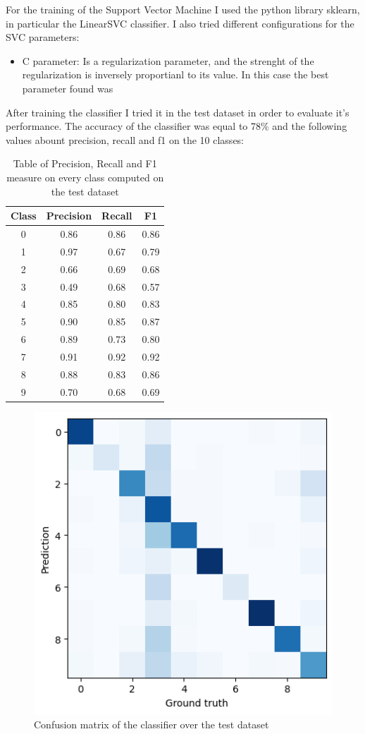\documentclass[12pt,journal,compsoc]{IEEEtran}
\begin{document}
For the training of the Support Vector Machine I used the python library sklearn, in particular the LinearSVC classifier. I also tried different configurations for the SVC parameters:
\begin{itemize}
	\item C parameter: Is a regularization parameter, and the strenght of the regularization is inversely proportianl to its value. In this case the best parameter found was 
\end{itemize}
After training the classifier I tried it in the test dataset in order to evaluate it's performance. The accuracy of the classifier was equal to 78\% and the following values abount precision, recall and f1 on the 10 classes:
\begin{table}[ht]
	\centering
	\begin{tabular}{c c c c }
		Class & Precision & Recall & F1  \\
		\hline
		0 & 0.86 &0.86  &0.86        \\
		1 & 0.97 &0.67  &0.79        \\
		2 & 0.66 &0.69  &0.68        \\
		3 & 0.49 &0.68  &0.57        \\ 
		4 & 0.85 &0.80  &0.83        \\
		5 & 0.90 &0.85  &0.87        \\
		6 & 0.89 &0.73  &0.80        \\
		7 & 0.91 &0.92  &0.92        \\
		8 & 0.88 &0.83  &0.86        \\
		9 & 0.70 &0.68  &0.69        \\
	\end{tabular}
	\caption{Table of Precision, Recall and F1 measure on every class computed on the test dataset}
	\end{table}
	\begin{figure}[H]
		\begin{center}
		\includegraphics[scale=.75]{./images/confmat_soundClassification.png}
		\end{center}
		\caption{Confusion matrix of the classifier over the test dataset}
	\end{figure}
\end{document}

